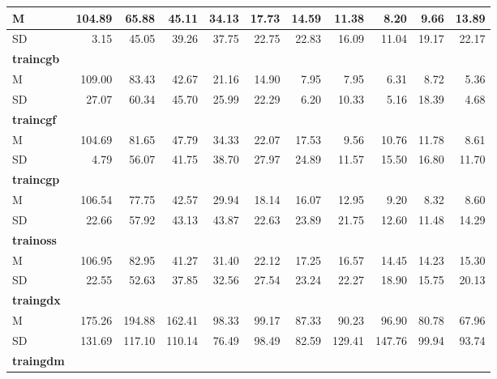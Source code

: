 \begin{table}[htbp]
\begin{adjustbox}{width=\textwidth}
\begin{tabular}{|l|r|r|r|r|r|r|r|r|r|r|}
			\midrule
			M     & 104.89 & 65.88 & 45.11 & 34.13 & 17.73 & 14.59 & 11.38 & 8.20  & 9.66  & 13.89 \\
			\midrule
			SD    & 3.15  & 45.05 & 39.26 & 37.75 & 22.75 & 22.83 & 16.09 & 11.04 & 19.17 & 22.17 \\
			\midrule
			\textbf{traincgb} &       &       &       &       &       &       &       &       &       &  \\
			\midrule
			M     & 109.00 & 83.43 & 42.67 & 21.16 & 14.90 & 7.95  & 7.95  & 6.31  & 8.72  & 5.36 \\
			\midrule
			SD    & 27.07 & 60.34 & 45.70 & 25.99 & 22.29 & 6.20  & 10.33 & 5.16  & 18.39 & 4.68 \\
			\midrule
			\textbf{traincgf} &       &       &       &       &       &       &       &       &       &  \\
			\midrule
			M     & 104.69 & 81.65 & 47.79 & 34.33 & 22.07 & 17.53 & 9.56  & 10.76 & 11.78 & 8.61 \\
			\midrule
			SD    & 4.79  & 56.07 & 41.75 & 38.70 & 27.97 & 24.89 & 11.57 & 15.50 & 16.80 & 11.70 \\
			\midrule
			\textbf{traincgp} &       &       &       &       &       &       &       &       &       &  \\
			\midrule
			M     & 106.54 & 77.75 & 42.57 & 29.94 & 18.14 & 16.07 & 12.95 & 9.20  & 8.32  & 8.60 \\
			\midrule
			SD    & 22.66 & 57.92 & 43.13 & 43.87 & 22.63 & 23.89 & 21.75 & 12.60 & 11.48 & 14.29 \\
			\midrule
			\textbf{trainoss} &       &       &       &       &       &       &       &       &       &  \\
			\midrule
			M     & 106.95 & 82.95 & 41.27 & 31.40 & 22.12 & 17.25 & 16.57 & 14.45 & 14.23 & 15.30 \\
			\midrule
			SD    & 22.55 & 52.63 & 37.85 & 32.56 & 27.54 & 23.24 & 22.27 & 18.90 & 15.75 & 20.13 \\
			\midrule
			\textbf{traingdx} &       &       &       &       &       &       &       &       &       &  \\
			\midrule
			M     & 175.26 & 194.88 & 162.41 & 98.33 & 99.17 & 87.33 & 90.23 & 96.90 & 80.78 & 67.96 \\
			\midrule
			SD    & 131.69 & 117.10 & 110.14 & 76.49 & 98.49 & 82.59 & 129.41 & 147.76 & 99.94 & 93.74 \\
			\midrule
			\textbf{traingdm} &       &       &       &       &       &       &       &       &       &  \\

\end{tabular}
\end{adjustbox}
\end{table}
